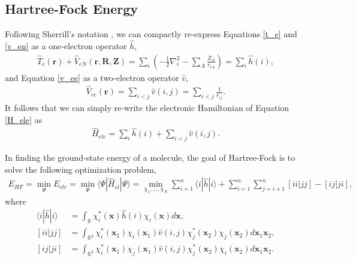 \documentclass[12pt]{article}
\newcommand{\vect}[1]{\boldsymbol{#1}}
\newcommand{\Hel}{\hat{H}_{el}}
\newcommand{\R}{\mathbb{R}}
\begin{document}
\subsection{Hartree-Fock Energy}
Following Sherrill's notation \cite{sherrill2001}, we can compactly re-express Equations \ref{t_e} and \ref{v_en} as a one-electron operator $\hat{h}$,
\begin{align}
\hat{T}_e(\vect{r}) + \hat{V}_{eN}(\vect{r}, \vect{R}, \vect{Z})  = \sum_{i} \left(-\frac{1}{2} \nabla_i^2 - \sum_A \frac{Z_A}{r_{iA}}\right) = \sum_{i} \hat{h}(i) ,
\end{align}
and Equation \ref{v_ee} as a two-electron operator $\hat{v}$,
\begin{align}
\hat{V}_{ee}(\vect{r}) = \sum_{i < j} \hat{v}(i, j) = \sum_{i < j} \frac{1}{r_{ij}}.
\end{align}
It follows that we can simply re-write the electronic Hamiltonian of Equation \ref{H_ele} as 
\begin{align}
\hat{H}_{ele}  = \sum_i \hat{h}(i) + \sum_{i < j}\hat{v}(i, j).
\end{align}

In finding the ground-state energy of a molecule, the goal of Hartree-Fock is to solve the following optimization problem, 
\begin{align}
E_{HF} = \min_{\Psi} E_{ele} = \min_{\Psi} \langle \Psi | \Hel | \Psi \rangle = \min_{\chi_1, \ldots, \chi_N} \sum_{i=1}^n \langle i | \hat{h} | i \rangle + \sum_{i=1}^n \sum_{j=i+1}^n [ i i | jj] - [ij | ji], 
\end{align}
where
\begin{align}
\langle i | \hat{h} | i \rangle &= \int_\R \chi_i^*(\vect x) \hat{h}(i) \chi_i (\vect x) d \vect x, \\
[ii | jj] &= \int_{\R^2} \chi_i^*(\vect x_1) \chi_i(\vect x_1) \hat{v}(i, j) \chi_j^*(\vect x_2) \chi_j(\vect x_2) d\vect x_1 \vect x_2, \\
[ij | ji] &= \int_{\R^2} \chi_i^*(\vect x_1) \chi_j(\vect x_1) \hat{v}(i, j) \chi_j^*(\vect x_2) \chi_i(\vect x_2) d\vect x_1 \vect x_2.
\end{align}
\end{document}
